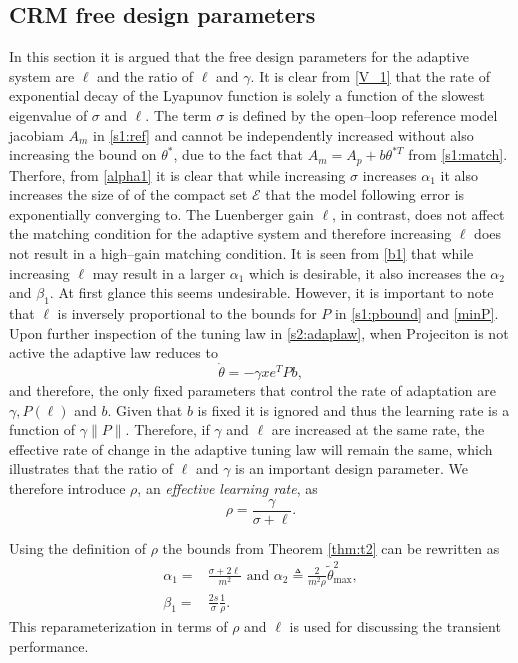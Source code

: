 \documentclass[10pt,journal]{IEEEtran}
\theoremstyle{plain}%
\theoremstyle{definition}
\newcommand{\be}[0]{\begin{equation}}
\newcommand{\ee}[0]{\end{equation}}
\newcommand{\ben}[0]{\begin{equation*}}
\newcommand{\een}[0]{\end{equation*}}
\newcommand{\norms}[1]{\lVert#1\rVert}
\newcommand{\normB}[0]{\norms}
\let\norm=\normB
\begin{document}
\subsection{CRM free design parameters}
In this section it is argued that the free design parameters for the adaptive system are $\ell$ and the ratio of $\ell$ and $\gamma$. It is clear from \eqref{V_1} that the rate of exponential decay of the Lyapunov function is solely a function of the slowest eigenvalue of $\sigma$ and $\ell$. The term $\sigma$ is defined by the open--loop reference model jacobiam $A_m$ in \eqref{s1:ref} and cannot be independently increased without also increasing the bound on $\theta^*$, due to the fact that $A_m= A_p+b\theta^{*T}$ from \eqref{s1:match}.  Therfore, from \eqref{alpha1} it is clear that while increasing $\sigma$ increases $\alpha_1$ it also increases the size of of the compact set $\mathcal E$ that the model following error is exponentially converging to. The Luenberger gain $\ell$, in contrast, does not affect the matching condition for the adaptive system and therefore increasing $\ell$ does not result in a high--gain matching condition. It is seen from \eqref{b1} that while increasing $\ell$ may result in a larger $\alpha_1$ which is desirable, it also increases the $\alpha_2$ and $\beta_1$. At first glance this seems undesirable. However, it is important to note that $\ell$ is inversely proportional to the bounds for  $P$ in \eqref{s1:pbound} and \eqref{minP}. Upon further inspection of the tuning law in \eqref{s2:adaplaw}, when Projeciton is not active the adaptive law reduces to
\ben
\dot\theta= -\gamma  x e^T P b,
\een
and therefore, the only fixed parameters that control the rate of adaptation are $\gamma, P(\ell)$ and $b$. Given that $b$ is fixed it is ignored and thus the learning rate is a function of $\gamma \norm P $. Therefore, if $\gamma$ and $\ell$ are increased at the same rate, the effective rate of change in the adaptive tuning law will remain the same, which illustrates that the ratio of $\ell$ and $\gamma$ is an important design parameter. 
We therefore introduce $\rho$, an {\em effective learning rate}, as
\be\label{rhos}
\rho = \frac{\gamma}{\sigma + \ell}.
\ee

Using the definition of $\rho$ the bounds from Theorem \ref{thm:t2} can be rewritten as
\be\label{newbounds}
\begin{split}
\alpha_1  =& \frac{\sigma+2\ell}{m^2}\text{ and }  \alpha_2  \triangleq\frac 2 {m^2 \rho}  \tilde\theta_\text{max}^2, \\
\beta_1 =&  \frac{2s }{\sigma}\frac{1}{ \rho}.
\end{split}
\ee
This reparameterization in terms of $\rho$ and $\ell$ is used for discussing the transient performance.
\end{document}
